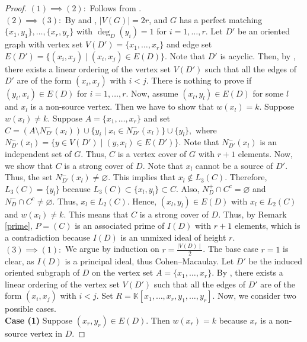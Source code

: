 \documentclass[11pt,reqno]{amsart}
\let\emptyset\varnothing
\theoremstyle{definition}
\begin{document}
\begin{proof}
	$(1) \implies (2):$ Follows from \cite[Corollary 3.1.17]{v15}. \\
	$(2) \implies (3):$ By \cite[Theorem 2.4]{v90} and \cite[Corollary 2.5]{v90}, $|V(G)| = 2r$, and $G$ has a perfect matching $\{x_1, y_1\}, \dots, \{x_r, y_r\}$ with $\deg_D(y_i) = 1$ for $i = 1, \dots, r$.
Let $D'$ be an oriented graph with vertex set $V(D') = \{x_1, \ldots, x_r\}$ and edge set $E(D')=\{(x_i, x_j) \mid (x_i, x_j) \in E(D)\}$. Note that $D'$ is acyclic. Then, by \cite[Theorem 16.3(4),p.200]{h69}, there exists a linear ordering of the vertex set $V(D')$ such that all the edges of $D'$ are of the form $(x_i, x_j)$ with $i < j$. There is nothing to prove if $(y_i, x_i) \in E(D)$ for $i = 1, \ldots, r$. Now, assume $(x_l, y_l) \in E(D)$ for some $l$ and $x_l$ is a non-source vertex. Then we have to show that $w(x_l) = k$.  Suppose $w(x_l) \neq k$. Suppose $A = \{x_1, \ldots, x_r\}$ and set $C = (A\setminus N^{-}_{D'}(x_l)) \cup \{y_i \mid x_i \in N^{-}_{D'}(x_l)\} \cup \{y_l\},$ where $N^{-}_{D'}(x_l)=\{y \in V(D') \mid (y,x_l) \in E(D')\}$. Note that $N^{-}_{D'}(x_l)$ is an independent set of $G$. Thus, $C$ is a vertex cover of $G$ with $r+1$ elements. Now, we show that $C$ is a strong cover of $D$. Note that $x_l$ cannot be a source of $D'$. Thus, the set $N^{-}_{D'}(x_l) \neq \emptyset $. This implies that $x_l \not \in L_3(C)$. Therefore, $L_3(C) = \{y_l\}$ because $L_3(C) \subset \{x_l, y_l\} \subset C$. Also, $N_D^+ \cap C^c = \emptyset$ and $N_D^- \cap C^c \neq \emptyset$. Thus, $x_l \in L_2(C)$. Hence, $(x_l, y_l) \in E(D)$ with $x_l \in L_2(C)$ and $w(x_l) \neq k$. This means that $C$ is a strong cover of $D$. Thus, by Remark \ref{prime}, $P =(C)$ is an associated prime of $I(D)$ with $r+1$ elements, which is a contradiction because $I(D)$ is an unmixed ideal of height $r$. \\
	$(3) \implies (1):$
	We argue by induction on $r=\frac{\mid V(D) \mid}{2}$. The base case $r = 1$ is clear, as $I(D)$ is a principal ideal, thus Cohen–Macaulay. Let $D'$ be the induced oriented subgraph of $D$ on the vertex set $A = \{x_1, \ldots, x_r\}$.  By \cite[ Theorem 16.3(4), p. 200]{h69}, there exists a linear ordering of the vertex set $V(D')$ such that all the edges of $D'$ are of the form $(x_i, x_j)$ with $i < j$. Set $R = \mathbb{K}[x_1, \ldots, x_r, y_1, \ldots, y_r]$. Now, we consider two possible cases. \\
	\noindent
	\textbf{Case (1)} Suppose $(x_r, y_r) \in E(D)$. Then $w(x_r) = k$ because $x_r$ is a non-source vertex in $D$. 
   

\end{proof}
\end{document}
